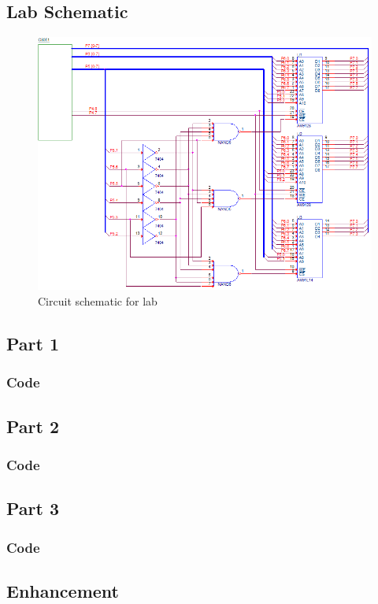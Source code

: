 \documentclass[12pt]{article}
\begin{document}
\subsection{Lab Schematic}
	\begin{figure}[H]
		\centering
		\includegraphics[width=\textwidth]{Schematic.png}
		\caption{Circuit schematic for lab}
		\label{schematic}
	\end{figure}
\subsection{Part 1}
\subsubsection{Code}
	
\subsection{Part 2}
\subsubsection{Code}
		
\subsection{Part 3}
\subsubsection{Code}
	
\subsection{Enhancement}
\end{document}
